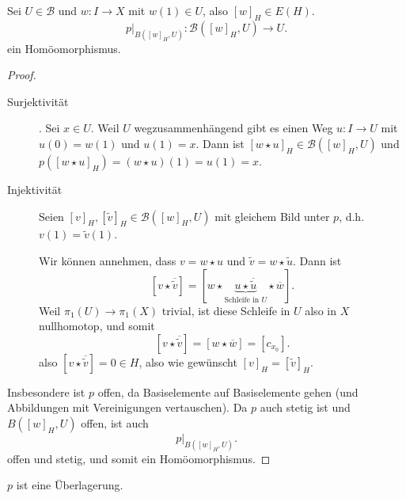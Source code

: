 \begin{lemma}\label{lm:homöomorphismus-zwischen-u-und-b-u-in-universeller-überlagerung}
    Sei $U\in \mathcal{B}$ und $w\colon  I \to  X$ mit $w(1)\in U$, also $[w]_H \in E(H)$.
    \[
        p|_{B([w]_H, U)} \colon  \mathcal{B}([w]_H, U) \to  U
    .\] 
    ein Homöomorphismus.
\end{lemma}

\begin{proof}
    \begin{description}
        \item[Surjektivität]. Sei $x\in U$. Weil $U$ wegzusammenhängend gibt es einen Weg  $u\colon  I \to  U$ mit $u(0) = w(1)$ und  $u(1) = x$. Dann ist  $[w \star u]_H \in  \mathcal{B}([w]_H, U)$ und $p([w \star u]_H) = ( w \star u) (1) = u(1) = x$. 
        \item[Injektivität] Seien $[v]_H, [\tilde{v}]_H\in \mathcal{B}([w]_H, U)$ mit gleichem Bild unter $p$, d.h.  $v(1) = \tilde{v}(1)$.

            Wir können annehmen, dass $v = w \star u$ und  $\tilde{v} = w \star \tilde{u}$. Dann ist
            \[
                [ v \star \overline{\tilde{v}}] = [ w \star \underbrace{u \star \overline{\tilde{u}}}_{\text{Schleife in $U$}}\star \overline{w}]
            .\] 
            Weil $\pi_1(U) \to  \pi_1(X)$ trivial, ist diese Schleife in $U$ also in  $X$ nullhomotop, und somit
             \[
                 [v \star \overline{\tilde{v}}] = [ w \star \overline{w}] = [c_{x_0}]
            .\] 
            also $[v \star \overline{\tilde{v}}] = 0 \in H$, also wie gewünscht $[v]_H = [\tilde{v}]_H$.
    \end{description}
    Insbesondere ist $p$ offen, da  Basiselemente auf Basiselemente gehen (und Abbildungen mit Vereinigungen vertauschen). Da $p$ auch stetig ist und  $B([w]_H, U)$ offen, ist auch 
     \[
         p|_{B([w]_H, U)}
    .\] 
    offen und stetig, und somit ein Homöomorphismus.
\end{proof}

\begin{proposition}
    $p$ ist eine Überlagerung.
\end{proposition}


